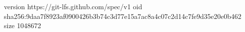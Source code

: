 version https://git-lfs.github.com/spec/v1
oid sha256:9daa7f8923af0900426b3b74c3d77e15a7ac8a4c07c2d14c7fe9d35e20e0b462
size 1048672
